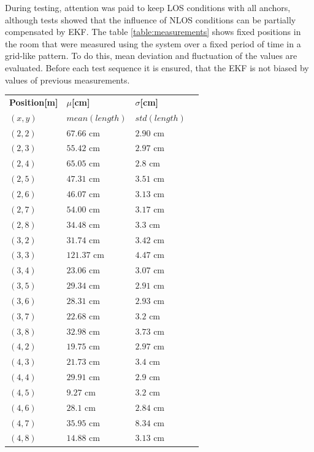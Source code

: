 \documentclass[final, conference, a4paper]{IEEEtran}
\begin{document}
During testing, attention was paid to keep \ac{LOS} conditions with all anchors,
although tests showed that the influence of \ac{NLOS} conditions can be partially compensated by \ac{EKF}.
The table \ref{table:measurements} shows fixed positions in the room that were measured using the system
over a fixed period of time in a grid-like pattern. 
To do this, mean deviation and fluctuation of the values are evaluated. 
Before each test sequence it is ensured, that the \ac{EKF} is not biased by values of previous measurements. 

\begin{table}[hbt!]
	\centering
	\begin{tabular}{l l l c}
		\textbf{Position[m]} & \textbf{$\mu$[cm]} & \textbf{$\sigma$[cm]}\\
		$(x,y)$ & $mean(length)$ & $std(length)$\\
		$(2,2)$ & $67.66$ cm & $2.90$ cm\\
		$(2,3)$ & $55.42$ cm & $2.97$ cm\\
		$(2,4)$ & $65.05$ cm & $2.8$ cm\\
		$(2,5)$ & $47.31$ cm & $3.51$ cm\\
		$(2,6)$ & $46.07$ cm & $3.13$ cm\\
		$(2,7)$ & $54.00$ cm & $3.17$ cm\\
		$(2,8)$ & $34.48$ cm & $3.3$ cm\\

		$(3,2)$ & $31.74$ cm & $3.42$ cm\\
		$(3,3)$ & $121.37$ cm & $4.47$ cm\\
		$(3,4)$ & $23.06$ cm & $3.07$ cm\\
		$(3,5)$ & $29.34$ cm & $2.91$ cm\\
		$(3,6)$ & $28.31$ cm & $2.93$ cm\\
		$(3,7)$ & $22.68$ cm & $3.2$ cm\\
		$(3,8)$ & $32.98$ cm & $3.73$ cm\\

		$(4,2)$ & $19.75$ cm & $2.97$ cm\\
		$(4,3)$ & $21.73$ cm & $3.4$ cm\\
		$(4,4)$ & $29.91$ cm & $2.9$ cm\\
		$(4,5)$ & $9.27$ cm & $3.2$ cm\\
		$(4,6)$ & $28.1$ cm & $2.84$ cm\\
		$(4,7)$ & $35.95$ cm & $8.34$ cm\\
		$(4,8)$ & $14.88$ cm & $3.13$ cm\\


\end{tabular}
\end{table}
\end{document}
